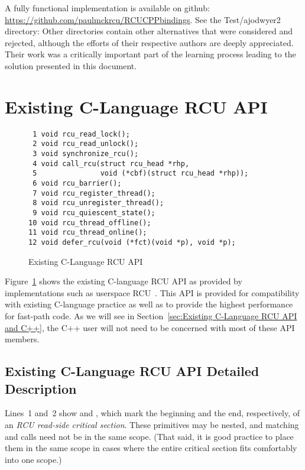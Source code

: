 \documentclass[letterpaper,10pt]{article}
\begin{document}
A fully functional implementation is available on github:
\url{https://github.com/paulmckrcu/RCUCPPbindings}.
See the Test/ajodwyer2 directory: Other directories contain other
alternatives that were considered and rejected, although the efforts
of their respective authors are deeply appreciated.
Their work was a critically important part of the learning process
leading to the solution presented in this document.

\section{Existing C-Language RCU API}
\label{sec:Existing C-Language RCU API}

\begin{figure}[tbp]
{ \scriptsize
\begin{verbatim}
 1 void rcu_read_lock();
 2 void rcu_read_unlock();
 3 void synchronize_rcu();
 4 void call_rcu(struct rcu_head *rhp,
 5               void (*cbf)(struct rcu_head *rhp));
 6 void rcu_barrier();
 7 void rcu_register_thread();
 8 void rcu_unregister_thread();
 9 void rcu_quiescent_state();
10 void rcu_thread_offline();
11 void rcu_thread_online();
12 void defer_rcu(void (*fct)(void *p), void *p);
\end{verbatim}
}
\caption{Existing C-Language RCU API}
\label{fig:Existing C-Language RCU API}
\end{figure}

Figure~\ref{fig:Existing C-Language RCU API}
shows the existing C-language RCU API as provided by implementations such as
userspace RCU~\cite{MathieuDesnoyers2009URCU,PaulMcKenney2013LWNURCU}.
This API is provided for compatibility with existing C-language practice as
well as to provide the highest performance for fast-path code.
As we will see in
Section~\ref{sec:Existing C-Language RCU API and C++},
the C++ user will not need to be concerned with most
of these API members.

\subsection{Existing C-Language RCU API Detailed Description}
\label{sec:Existing C-Language RCU API Detailed Description}

Lines~1 and~2 show  and ,
which mark the beginning and the end, respectively, of an \emph{RCU read-side
critical section}.
These primitives may be nested, and matching 
and  calls need not be in the same scope.
(That said, it is good practice to place them in the same scope
in cases where the entire critical section fits comfortably into
one scope.)
\end{document}
